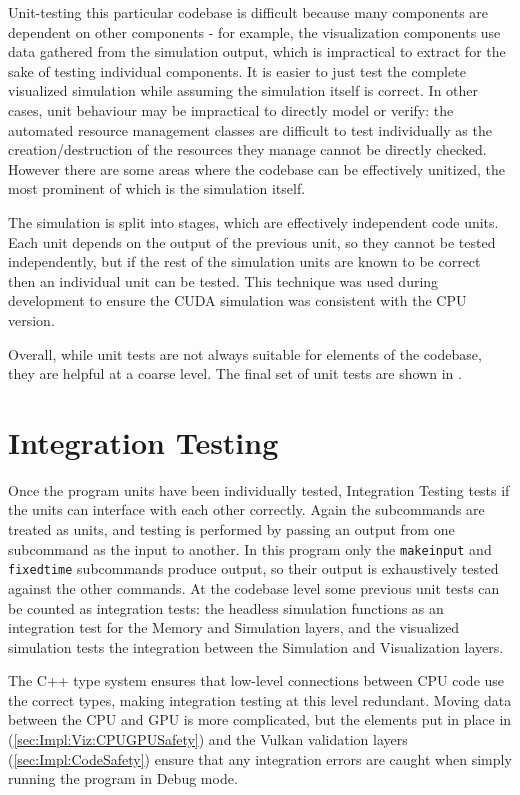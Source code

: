 Unit-testing this particular codebase is difficult because many components are dependent on other components - for example, the visualization components use data gathered from the simulation output, which is impractical to extract for the sake of testing individual components.
It is easier to just test the complete visualized simulation while assuming the simulation itself is correct.
In other cases, unit behaviour may be impractical to directly model or verify: the automated resource management classes are difficult to test individually as the creation/destruction of the resources they manage cannot be directly checked.
However there are some areas where the codebase can be effectively unitized, the most prominent of which is the simulation itself.

The simulation is split into stages, which are effectively independent code units.
Each unit depends on the output of the previous unit, so they cannot be tested independently, but if the rest of the simulation units are known to be correct then an individual unit can be tested.
This technique was used during development to ensure the CUDA simulation was consistent with the CPU version.

Overall, while unit tests are not always suitable for elements of the codebase, they are helpful at a coarse level.
The final set of unit tests are shown in .



\section{Integration Testing}
Once the program units have been individually tested, Integration Testing tests if the units can interface with each other correctly.
Again the subcommands are treated as units, and testing is performed by passing an output from one subcommand as the input to another.
In this program only the \texttt{makeinput} and \texttt{fixedtime} subcommands produce output, so their output is exhaustively tested against the other commands.
At the codebase level some previous unit tests can be counted as integration tests:
the headless simulation functions as an integration test for the Memory and Simulation layers, and the visualized simulation tests the integration between the Simulation and Visualization layers.

The C++ type system ensures that low-level connections between CPU code use the correct types, making integration testing at this level redundant.
Moving data between the CPU and GPU is more complicated, but the elements put in place in (\cref{sec:Impl:Viz:CPUGPUSafety}) and the Vulkan validation layers (\cref{sec:Impl:CodeSafety}) ensure that any integration errors are caught when simply running the program in Debug mode.

